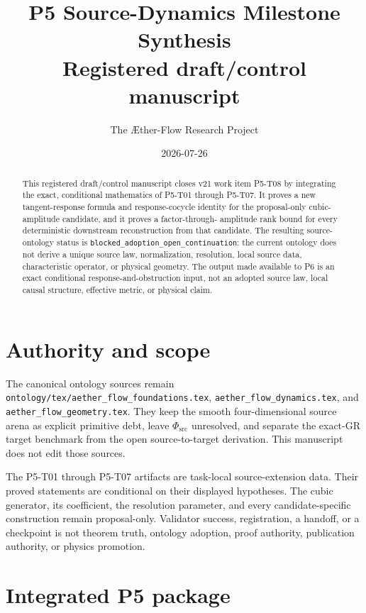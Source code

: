 \documentclass[11pt]{article}
\title{P5 Source-Dynamics Milestone Synthesis\\
\large Registered draft/control manuscript}
\author{The \AE ther-Flow Research Project}
\date{2026-07-26}
\newcommand{\Phisrc}{\Phi_{\mathrm{src}}}
\begin{document}
\maketitle

\begin{abstract}
This registered draft/control manuscript closes v21 work item P5-T08 by
integrating the exact, conditional mathematics of P5-T01 through P5-T07.
It proves a new tangent-response formula and response-cocycle identity for the
proposal-only cubic-amplitude candidate, and it proves a factor-through-
amplitude rank bound for every deterministic downstream reconstruction from
that candidate.  The resulting source-ontology status is
\texttt{blocked\_adoption\_open\_continuation}: the current ontology does not
derive a unique source law, normalization, resolution, local source data,
characteristic operator, or physical geometry.  The output made available to
P6 is an exact conditional response-and-obstruction input, not an adopted
source law, local causal structure, effective metric, or physical claim.
\end{abstract}

\section{Authority and scope}

The canonical ontology sources remain
\texttt{ontology/tex/aether\_flow\_foundations.tex},
\texttt{aether\_flow\_dynamics.tex}, and
\texttt{aether\_flow\_geometry.tex}.  They keep the smooth four-dimensional
source arena as explicit primitive debt, leave \(\Phisrc\) unresolved, and
separate the exact-GR target benchmark from the open source-to-target
derivation.  This manuscript does not edit those sources.

The P5-T01 through P5-T07 artifacts are task-local source-extension data.
Their proved statements are conditional on their displayed hypotheses.  The
cubic generator, its coefficient, the resolution parameter, and every
candidate-specific construction remain proposal-only.  Validator success,
registration, a handoff, or a checkpoint is not theorem truth, ontology
adoption, proof authority, publication authority, or physics promotion.

\section{Integrated P5 package}
\end{document}
